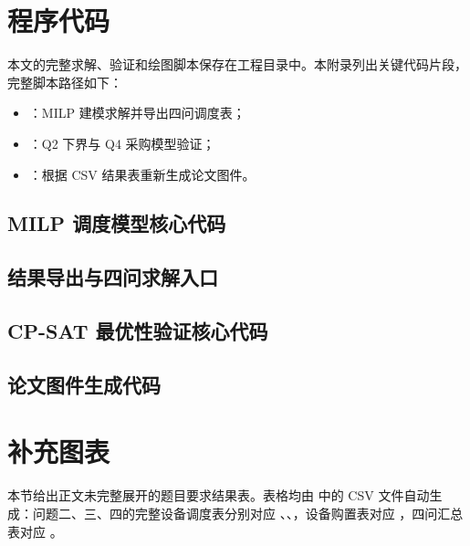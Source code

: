 \section{程序代码}

本文的完整求解、验证和绘图脚本保存在工程目录中。本附录列出关键代码片段，完整脚本路径如下：
\begin{itemize}
  \item {}：MILP 建模求解并导出四问调度表；
  \item {}：Q2 下界与 Q4 采购模型验证；
  \item {}：根据 CSV 结果表重新生成论文图件。
\end{itemize}

\lstset{basicstyle=\scriptsize\ttfamily, breakatwhitespace=false}

\subsection{MILP 调度模型核心代码}


\subsection{结果导出与四问求解入口}


\subsection{CP-SAT 最优性验证核心代码}




\subsection{论文图件生成代码}


\section{补充图表}

本节给出正文未完整展开的题目要求结果表。表格均由  中的 CSV 文件自动生成：问题二、三、四的完整设备调度表分别对应 、、，设备购置表对应 ，四问汇总表对应 。


